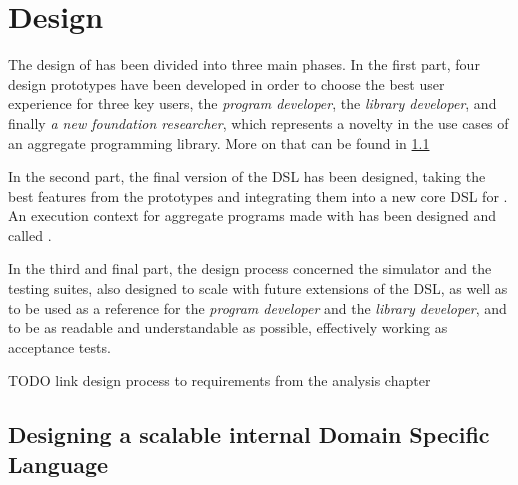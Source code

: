 \chapter{Design}
\label{chap:design}
The design of \this has been divided into three main phases.
%
In the first part, four design prototypes have been developed in order to choose the best user experience for three key users, the \textit{program developer}, the \textit{library developer}, and finally \textit{a new foundation researcher}, which represents a novelty in the use cases of an aggregate programming library.
%
More on that can be found in \cref{chap:design->sec:dsl}

In the second part, the final version of the \ac{DSL} has been designed, taking the best features from the prototypes and integrating them into a new core \ac{DSL} for \this.
%
An execution context for aggregate programs made with \this has been designed and called .

In the third and final part, the design process concerned the simulator and the testing suites, also designed to scale with future extensions of the \ac{DSL}, as well as to be used as a reference for the \textit{program developer} and the \textit{library developer}, and to be as readable and understandable as possible, effectively working as acceptance tests.

TODO link design process to requirements from the analysis chapter

\section{Designing a scalable internal Domain Specific Language} \label{chap:design->sec:dsl}

